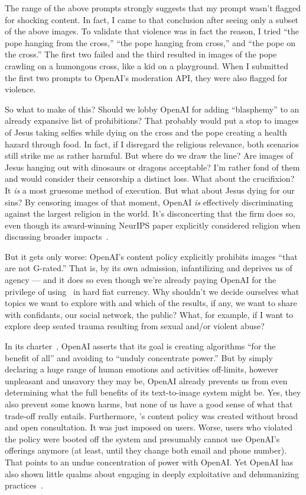 The range of the above prompts strongly suggests that my prompt wasn't flagged
for shocking content. In fact, I came to that conclusion after seeing only a
subset of the above images. To validate that violence was in fact the reason, I
tried ``the pope hanging from the cross,'' ``the pope hanging from cross,'' and
``the pope on the cross.'' The first two failed and the third resulted in images
of the pope crawling on a humongous cross, like a kid on a playground. When I
submitted the first two prompts to OpenAI's moderation API, they were also
flagged for violence.

\sectionbreak{}

\noindent{}So what to make of this? Should we lobby OpenAI for adding
``blasphemy'' to an already expansive list of prohibitions? That probably would
put a stop to images of Jesus taking selfies while dying on the cross and the
pope creating a health hazard through food. In fact, if I disregard the
religious relevance, both scenarios still strike me as rather harmful. But where
do we draw the line? Are images of Jesus hanging out with dinosaurs or dragons
acceptable? I'm rather fond of them and would consider their censorship a
distinct loss. What about the crucifixion? It \emph{is} a most gruesome method
of execution. But what about Jesus dying for our sins? By censoring images of
that moment, OpenAI \emph{is} effectively discriminating against the largest
religion in the world. It's disconcerting that the firm does so, even though its
award-winning NeurIPS paper explicitly considered religion when discussing
broader impacts~\cite{BrownMannea2020}.

But it gets only worse: OpenAI's content policy explicitly prohibits images
``that are not G-rated.'' That is, by its own admission, infantilizing and
deprives us of agency --- and it does so even though we're already paying OpenAI
for the privilege of using \DALLE\ in hard fiat currency. Why shouldn't we
decide ourselves what topics we want to explore with \DALLE and which of the
results, if any, we want to share with confidants, our social network, the
public? What, for example, if I want to explore deep seated trauma resulting
from sexual and/or violent abuse?

In its charter~\cite{OpenAI2018}, OpenAI asserts that its goal is creating
algorithms ``for the benefit of all'' and avoiding to ``unduly concentrate
power.'' But by simply declaring a huge range of human emotions and activities
off-limits, however unpleasant and unsavory they may be, OpenAI already prevents
us from even determining what the full benefits of its text-to-image system
might be. Yes, they also prevent some known harms, but none of us have a good
sense of what that trade-off really entails. Furthermore, \DALLE's content
policy was created without broad and open consultation. It was just imposed on
users. Worse, users who violated the policy were booted off the system and
presumably cannot use OpenAI's offerings anymore (at least, until they change
both email and phone number). That points to an undue concentration of power
with OpenAI. Yet OpenAI has also shown little qualms about engaging in deeply
exploitative and dehumanizing practices~\cite{HaoHernandez2022,Perrigo2023a}.

